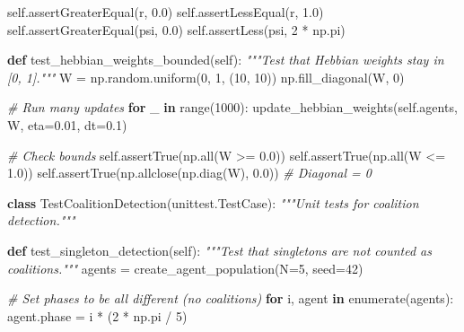 \documentclass[
]{article}
\newenvironment{Shaded}{}{}
\newcommand{\BuiltInTok}[1]{\textcolor[rgb]{0.00,0.50,0.00}{#1}}
\newcommand{\CommentTok}[1]{\textcolor[rgb]{0.38,0.63,0.69}{\textit{#1}}}
\newcommand{\ControlFlowTok}[1]{\textcolor[rgb]{0.00,0.44,0.13}{\textbf{#1}}}
\newcommand{\DecValTok}[1]{\textcolor[rgb]{0.25,0.63,0.44}{#1}}
\newcommand{\FloatTok}[1]{\textcolor[rgb]{0.25,0.63,0.44}{#1}}
\newcommand{\KeywordTok}[1]{\textcolor[rgb]{0.00,0.44,0.13}{\textbf{#1}}}
\newcommand{\NormalTok}[1]{#1}
\newcommand{\OperatorTok}[1]{\textcolor[rgb]{0.40,0.40,0.40}{#1}}
\newcommand{\VariableTok}[1]{\textcolor[rgb]{0.10,0.09,0.49}{#1}}
\begin{document}
\begin{Shaded}
\begin{Highlighting}[]
        \VariableTok{self}\NormalTok{.assertGreaterEqual(r, }\FloatTok{0.0}\NormalTok{)}
        \VariableTok{self}\NormalTok{.assertLessEqual(r, }\FloatTok{1.0}\NormalTok{)}
        \VariableTok{self}\NormalTok{.assertGreaterEqual(psi, }\FloatTok{0.0}\NormalTok{)}
        \VariableTok{self}\NormalTok{.assertLess(psi, }\DecValTok{2} \OperatorTok{*}\NormalTok{ np.pi)}

    \KeywordTok{def}\NormalTok{ test\_hebbian\_weights\_bounded(}\VariableTok{self}\NormalTok{):}
        \CommentTok{"""Test that Hebbian weights stay in [0, 1]."""}
\NormalTok{        W }\OperatorTok{=}\NormalTok{ np.random.uniform(}\DecValTok{0}\NormalTok{, }\DecValTok{1}\NormalTok{, (}\DecValTok{10}\NormalTok{, }\DecValTok{10}\NormalTok{))}
\NormalTok{        np.fill\_diagonal(W, }\DecValTok{0}\NormalTok{)}

        \CommentTok{\# Run many updates}
        \ControlFlowTok{for}\NormalTok{ \_ }\KeywordTok{in} \BuiltInTok{range}\NormalTok{(}\DecValTok{1000}\NormalTok{):}
\NormalTok{            update\_hebbian\_weights(}\VariableTok{self}\NormalTok{.agents, W, eta}\OperatorTok{=}\FloatTok{0.01}\NormalTok{, dt}\OperatorTok{=}\FloatTok{0.1}\NormalTok{)}

        \CommentTok{\# Check bounds}
        \VariableTok{self}\NormalTok{.assertTrue(np.}\BuiltInTok{all}\NormalTok{(W }\OperatorTok{\textgreater{}=} \FloatTok{0.0}\NormalTok{))}
        \VariableTok{self}\NormalTok{.assertTrue(np.}\BuiltInTok{all}\NormalTok{(W }\OperatorTok{\textless{}=} \FloatTok{1.0}\NormalTok{))}
        \VariableTok{self}\NormalTok{.assertTrue(np.allclose(np.diag(W), }\FloatTok{0.0}\NormalTok{))  }\CommentTok{\# Diagonal = 0}


\KeywordTok{class}\NormalTok{ TestCoalitionDetection(unittest.TestCase):}
    \CommentTok{"""Unit tests for coalition detection."""}

    \KeywordTok{def}\NormalTok{ test\_singleton\_detection(}\VariableTok{self}\NormalTok{):}
        \CommentTok{"""Test that singletons are not counted as coalitions."""}
\NormalTok{        agents }\OperatorTok{=}\NormalTok{ create\_agent\_population(N}\OperatorTok{=}\DecValTok{5}\NormalTok{, seed}\OperatorTok{=}\DecValTok{42}\NormalTok{)}

        \CommentTok{\# Set phases to be all different (no coalitions)}
        \ControlFlowTok{for}\NormalTok{ i, agent }\KeywordTok{in} \BuiltInTok{enumerate}\NormalTok{(agents):}
\NormalTok{            agent.phase }\OperatorTok{=}\NormalTok{ i }\OperatorTok{*}\NormalTok{ (}\DecValTok{2} \OperatorTok{*}\NormalTok{ np.pi }\OperatorTok{/} \DecValTok{5}\NormalTok{)}


\end{Highlighting}
\end{Shaded}
\end{document}
